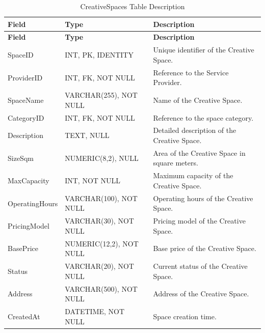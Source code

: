\begin{longtable}{
		|>{\raggedright\arraybackslash}p{3.2cm}|
		>{\raggedright\arraybackslash}p{4.2cm}|
		>{\raggedright\arraybackslash}p{5.0cm}|
	}
	\caption{CreativeSpaces Table Description}
	\label{tab:creative-spaces}\\
	\hline
	\textbf{Field} & \textbf{Type} & \textbf{Description} \\ \hline
	\endfirsthead
	\hline
	\textbf{Field} & \textbf{Type} & \textbf{Description} \\ \hline
	\endhead
	
	SpaceID & INT, PK, IDENTITY &
	Unique identifier of the Creative Space. \\ \hline
	
	ProviderID & INT, FK, NOT NULL &
	Reference to the Service Provider. \\ \hline
	
	SpaceName & VARCHAR(255), NOT NULL &
	Name of the Creative Space. \\ \hline
	
	CategoryID & INT, FK, NOT NULL &
	Reference to the space category. \\ \hline
	
	Description & TEXT, NULL &
	Detailed description of the Creative Space. \\ \hline
	
	SizeSqm & NUMERIC(8,2), NULL &
	Area of the Creative Space in square meters. \\ \hline
	
	MaxCapacity & INT, NOT NULL &
	Maximum capacity of the Creative Space. \\ \hline
	
	OperatingHours & VARCHAR(100), NOT NULL &
	Operating hours of the Creative Space. \\ \hline
	
	PricingModel & VARCHAR(30), NOT NULL &
	Pricing model of the Creative Space. \\ \hline
	
	BasePrice & NUMERIC(12,2), NOT NULL &
	Base price of the Creative Space. \\ \hline
	
	Status & VARCHAR(20), NOT NULL &
	Current status of the Creative Space. \\ \hline
	
	Address & VARCHAR(500), NOT NULL &
	Address of the Creative Space. \\ \hline
	
	CreatedAt & DATETIME, NOT NULL &
	Space creation time. \\ \hline
	
\end{longtable}


